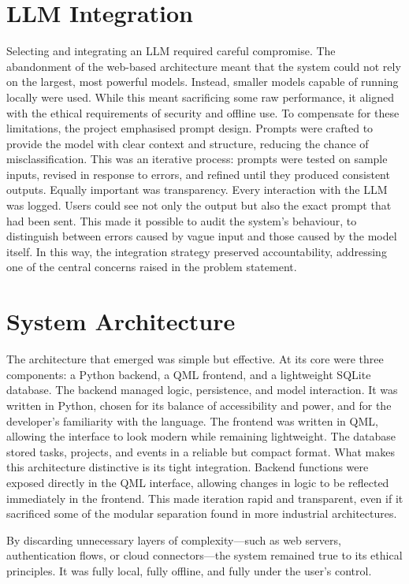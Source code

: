 \documentclass{report}
\begin{document}
\section{LLM Integration}

Selecting and integrating an LLM required careful compromise. The abandonment of the web-based architecture meant that the system could not rely on the largest, most powerful models. Instead, smaller models capable of running locally were used. While this meant sacrificing some raw performance, it aligned with the ethical requirements of security and offline use.
To compensate for these limitations, the project emphasised prompt design. Prompts were crafted to provide the model with clear context and structure, reducing the chance of misclassification. This was an iterative process: prompts were tested on sample inputs, revised in response to errors, and refined until they produced consistent outputs.
Equally important was transparency. Every interaction with the LLM was logged. Users could see not only the output but also the exact prompt that had been sent. This made it possible to audit the system’s behaviour, to distinguish between errors caused by vague input and those caused by the model itself. In this way, the integration strategy preserved accountability, addressing one of the central concerns raised in the problem statement.

\section{System Architecture}

The architecture that emerged was simple but effective. At its core were three components: a Python backend, a QML frontend, and a lightweight SQLite database.
The backend managed logic, persistence, and model interaction. It was written in Python, chosen for its balance of accessibility and power, and for the developer’s familiarity with the language. The frontend was written in QML, allowing the interface to look modern while remaining lightweight. The database stored tasks, projects, and events in a reliable but compact format.
What makes this architecture distinctive is its tight integration. Backend functions were exposed directly in the QML interface, allowing changes in logic to be reflected immediately in the frontend. This made iteration rapid and transparent, even if it sacrificed some of the modular separation found in more industrial architectures.

By discarding unnecessary layers of complexity—such as web servers, authentication flows, or cloud connectors—the system remained true to its ethical principles. It was fully local, fully offline, and fully under the user’s control.
\end{document}

